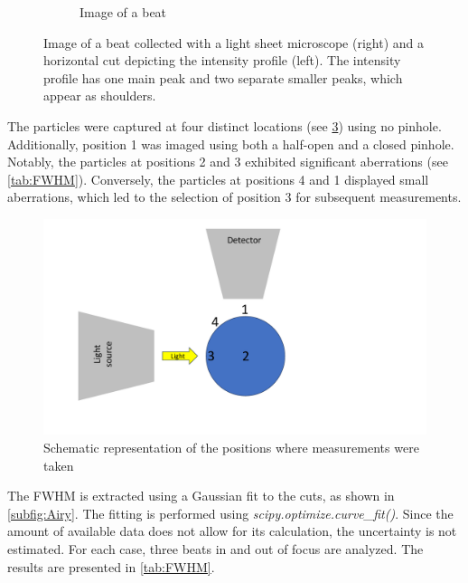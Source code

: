 \begin{figure}[h]
\begin{subfigure}{0.43\linewidth}
        \caption{Image of a beat}
        \label{subfig:AiryBild}
    \end{subfigure}
    \caption{Image of a beat collected with a light sheet microscope (right) and a horizontal cut depicting the intensity profile (left). The intensity profile has one main peak and two separate smaller peaks, which appear as shoulders.}
    \label{fig:Airy}
\end{figure}


The particles were captured at four distinct locations (see \cref{fig:PSFPosPoint}) using no pinhole. Additionally, position 1 was imaged using both a half-open and a closed pinhole. Notably, the particles at positions 2 and 3 exhibited significant aberrations (see \cref{tab:FWHM}).
Conversely, the particles at positions 4 and 1 displayed small aberrations, which led to the selection of position 3 for subsequent measurements.

\begin{figure}
    \centering
    \includegraphics[width = 12cm]{Bilder/PSF/Points_cropped.pdf}
    \caption{Schematic representation of the positions where measurements were taken}
    \label{fig:PSFPosPoint}
\end{figure}


The FWHM is extracted using a Gaussian fit to the cuts, as shown in \cref{subfig:Airy}. The fitting is
performed using \textit{scipy.optimize.curve\_fit()}. Since the amount of available data does not allow
for its calculation, the uncertainty is not estimated. For each case, three beats in and out of
focus are analyzed. The results are presented in \cref{tab:FWHM}.

